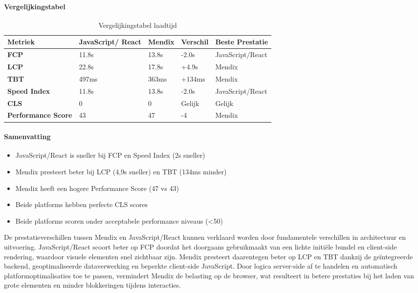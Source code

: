 \paragraph{Vergelijkingstabel}
\begin{table}[h]
    \centering
    \begin{tabular}{ |p{3cm}|p{2.25cm}|p{2.25cm}|p{2.25cm}|p{3.25cm}|}
        \hline
        \textbf{Metriek} & \textbf{JavaScript/} \newline \textbf{React} & \textbf{Mendix}  & \textbf{Verschil} & \textbf{Beste Prestatie}\\
        \hline
        \textbf{\gls{FCP}}  & 11.8s & 13.8s & -2.0s & JavaScript/React \\
        \hline
        \textbf{\gls{LCP}} & 22.8s & 17.8s & +4.9s & Mendix\\
        \hline
        \textbf{\gls{TBT}}  & 497ms & 363ms & +134ms & Mendix \\
        \hline
        \textbf{Speed Index}  & 11.8s & 13.8s & -2.0s & JavaScript/React \\
        \hline
        \textbf{\gls{CLS}}  & 0 & 0  & Gelijk & Gelijk \\
        \hline
        \textbf{Performance Score}  & 43 & 47  & -4 & Mendix \\
        \hline
    \end{tabular}
    \caption[\centering Vergelijkingstabel laadtijd]{\label{tab:Vergelijkingstabel laadtijd}Vergelijkingstabel laadtijd}
\end{table}

\paragraph{Samenvatting}
\begin{itemize}
    \item JavaScript/React is sneller bij \gls{FCP} en Speed Index (2s sneller)
    \item Mendix presteert beter bij \gls{LCP} (4,9s sneller) en \gls{TBT} (134ms minder)
    \item Mendix heeft een hogere Performance Score (47 vs 43)
    \item Beide platforms hebben perfecte \gls{CLS} scores
    \item Beide platforms scoren onder acceptabele performance niveaus (<50)
\end{itemize}
De prestatieverschillen tussen Mendix en JavaScript/React kunnen verklaard worden door fundamentele verschillen in architectuur en uitvoering. JavaScript/React scoort beter op \gls{FCP} doordat het doorgaans gebruikmaakt van een lichte initiële bundel en client-side rendering, waardoor visuele elementen snel zichtbaar zijn. Mendix presteert daarentegen beter op \gls{LCP} en \gls{TBT} dankzij de geïntegreerde backend, geoptimaliseerde dataverwerking en beperkte client-side JavaScript. Door logica server-side af te handelen en automatisch platformoptimalisaties toe te passen, vermindert Mendix de belasting op de browser, wat resulteert in betere prestaties bij het laden van grote elementen en minder blokkeringen tijdens interacties.

